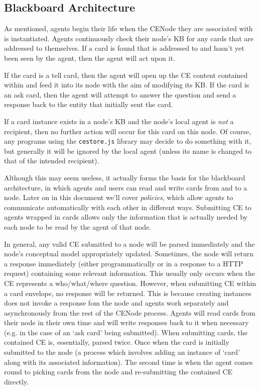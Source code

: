 \documentclass{scrartcl}
\newcommand{\js}[1]{\texttt{#1}}
\begin{document}
\subsection{Blackboard Architecture}
\label{blackboard_architecture}

As mentioned, agents begin their life when the CENode they are associated with is instantiated. Agents continuously check their node's KB for any cards that are addressed to themselves. If a card is found that is addressed to and hasn't yet been seen by the agent, then the agent will act upon it.

If the card is a tell card, then the agent will open up the CE content contained within and feed it into its node with the aim of modifying its KB. If the card is an ask card, then the agent will attempt to answer the question and send a response back to the entity that initially sent the card.

If a card instance exists in a node's KB and the node's local agent is \textit{not} a recipient, then no further action will occur for this card on this node. Of course, any programs using the \js{cestore.js} library may decide to do something with it, but generally it will be ignored by the local agent (unless its name is changed to that of the intended recipient).

Although this may seem useless, it actually forms the basis for the blackboard architecture, in which agents and users can read and write cards from and to a node. Later on in this document we'll cover \textit{policies}, which allow agents to communicate automatically with each other in different ways. Submitting CE to agents wrapped in cards allows only the information that is actually needed by each node to be read by the agent of that node.

In general, any valid CE submitted to a node will be parsed immediately and the node's conceptual model appropriately updated. Sometimes, the node will return a response immediately (either programmatically or in a response to a HTTP request) containing some relevant information. This usually only occurs when the CE represents a who/what/where question. However, when submitting CE within a card envelope, no response will be returned. This is because creating instances does not invoke a response fom the node and agents work separately and asynchronously from the rest of the CENode process. Agents will read cards from their node in their own time and will write responses back to it when necessary (e.g. in the case of an `ask card' being submitted). When submitting cards, the contained CE is, essentially, parsed twice. Once when the card is initially submitted to the node (a process which involves adding an instance of `card' along with its associated information). The second time is when the agent comes round to picking cards from the node and re-submitting the contained CE directly.
\end{document}
